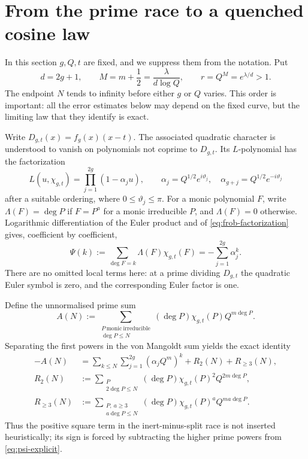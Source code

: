 \section{From the prime race to a quenched cosine law}
\label{sec:race-law}

In this section \(g,Q,t\) are fixed, and we suppress them from the notation.
Put
\begin{equation}
 d=2g+1,\qquad M=m+\frac12=\frac{\lambda}{d\log Q},
 \qquad r=Q^M=e^{\lambda/d}>1.
\label{eq:local-parameters}
\end{equation}
The endpoint \(N\) tends to infinity before either \(g\) or \(Q\) varies.
This order is important: all the error estimates below may depend on the
fixed curve, but the limiting law that they identify is exact.

Write \(D_{g,t}(x)=f_g(x)(x-t)\).  The associated quadratic character is
understood to vanish on polynomials not coprime to \(D_{g,t}\).  Its
\(L\)-polynomial has the factorization
\begin{equation}
 L(u,\chi_{g,t})=\prod_{j=1}^{2g}(1-\alpha_j u),
 \qquad
 \alpha_j=Q^{1/2}e^{i\vartheta_j},\quad
 \alpha_{g+j}=Q^{1/2}e^{-i\vartheta_j}
\label{eq:frob-factorization}
\end{equation}
after a suitable ordering, where \(0\leq\vartheta_j\leq\pi\).  For a monic
polynomial \(F\), write \(\Lambda(F)=\deg P\) if \(F=P^a\) for a monic
irreducible \(P\), and \(\Lambda(F)=0\) otherwise.  Logarithmic
differentiation of the Euler product and of \eqref{eq:frob-factorization}
gives, coefficient by coefficient,
\begin{equation}
 \Psi(k):=\sum_{\deg F=k}\Lambda(F)\chi_{g,t}(F)
 =-\sum_{j=1}^{2g}\alpha_j^k.
\label{eq:psi-explicit}
\end{equation}
There are no omitted local terms here: at a prime dividing \(D_{g,t}\) the
quadratic Euler symbol is zero, and the corresponding Euler factor is one.

Define the unnormalised prime sum
\[
 A(N):=\sum_{\substack{P\ \mathrm{monic\ irreducible}\\ \deg P\leq N}}
       (\deg P)\chi_{g,t}(P)Q^{m\deg P}.
\]
Separating the first powers in the von Mangoldt sum yields the exact identity
\begin{align}
 -A(N)
 &=\sum_{k\leq N}\sum_{j=1}^{2g}(\alpha_jQ^m)^k+R_2(N)+R_{\geq3}(N),
 \label{eq:exact-prime-decomposition}\\
 R_2(N)
 &:=\sum_{\substack{P\\2\deg P\leq N}}
       (\deg P)\chi_{g,t}(P)^2Q^{2m\deg P},
 \nonumber\\
 R_{\geq3}(N)
 &:=\sum_{\substack{P,\ a\geq3\\a\deg P\leq N}}
       (\deg P)\chi_{g,t}(P)^aQ^{ma\deg P}.
 \nonumber
\end{align}
Thus the positive square term in the inert-minus-split race is not inserted
heuristically; its sign is forced by subtracting the higher prime powers from
\eqref{eq:psi-explicit}.

